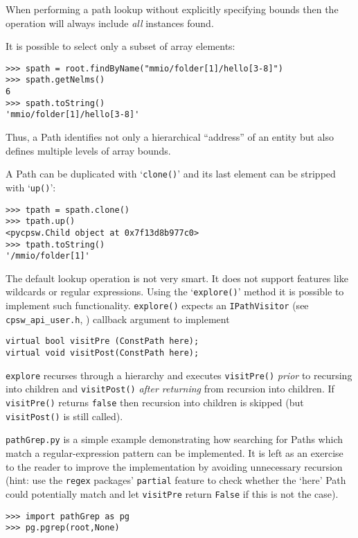 \documentclass[10pt]{article}
\newcommand{\Path}      {{Path}}
\newcommand{\Paths}     {{Paths}}
\newcommand{\cod}[1] {{\tt#1}}
\begin{document}
When performing a path lookup without explicitly specifying bounds then
the operation will always include {\em all} instances found.

It is possible to select only a subset of array elements:

\begin{verbatim}
>>> spath = root.findByName("mmio/folder[1]/hello[3-8]")
>>> spath.getNelms()
6
>>> spath.toString()
'mmio/folder[1]/hello[3-8]'
\end{verbatim}

Thus, a \Path{} identifies not only a hierarchical ``address''
of an entity but also defines multiple levels of array bounds.

A \Path{} can be duplicated with `\cod{clone()}' and its last element
can be stripped with `\cod{up()}':

\begin{verbatim}
>>> tpath = spath.clone()
>>> tpath.up()
<pycpsw.Child object at 0x7f13d8b977c0>
>>> tpath.toString()
'/mmio/folder[1]'
\end{verbatim}

The default lookup operation is not very smart. It does not support features
like wildcards or regular expressions. Using the `\cod{explore()}' method it is
possible to implement such functionality. \cod{explore()} expects an \cod{IPathVisitor}
(see \cod{cpsw\_api\_user.h}, \cite{userapi}) callback argument to implement 
\begin{verbatim}
virtual bool visitPre (ConstPath here);
virtual void visitPost(ConstPath here);
\end{verbatim}

\cod{explore} recurses through a hierarchy and executes \cod{visitPre()} {\em prior}
to recursing into children and \cod{visitPost()} {\em after returning} from recursion
into children. If \cod{visitPre()} returns \cod{false} then recursion into children
is skipped (but \cod{visitPost()} is still called).

\cod{pathGrep.py} is a simple example demonstrating how searching for \Paths{} which match
a regular-expression pattern can be implemented. It is left as an exercise to the reader
to improve the implementation by avoiding unnecessary recursion (hint: use the \cod{regex}
packages' \cod{partial} feature to check whether the `here' Path could potentially match
and let \cod{visitPre} return \cod{False} if this is not the case).

\begin{verbatim}
>>> import pathGrep as pg 
>>> pg.pgrep(root,None)
\end{verbatim}
\end{document}
